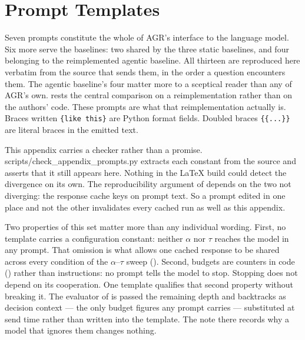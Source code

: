 \chapter{Prompt Templates}\label{app:prompts}


Seven prompts constitute the whole of AGR's interface to the language model. Six
more serve the baselines: two shared by the three static baselines, and four
belonging to the reimplemented agentic baseline. All thirteen are reproduced
here verbatim from the source that sends them, in the order a question
encounters them. The agentic baseline's four matter more to a sceptical reader
than any of AGR's own.  rests the central
comparison on a reimplementation rather than on the authors' code. These
prompts are what that reimplementation actually is. Braces written
\verb|{like this}| are Python format fields. Doubled braces \verb|{{...}}| are
literal braces in the emitted text.

This appendix carries a checker rather than a promise.
\textsf{scripts/\allowbreak check\_appendix\_prompts.py} extracts each constant
from the source and asserts that it still appears here. Nothing in the LaTeX
build could detect the divergence on its own. The reproducibility argument
of  depends on the two not diverging: the response
cache keys on prompt text. So a prompt edited in one place and not the other
invalidates every cached run as well as this appendix.

Two properties of this set matter more than any individual wording. First, no
template carries a configuration constant: neither $\alpha$ nor $\tau$ reaches
the model in any prompt. That omission is what allows one cached response to be
shared across every condition of the $\alpha$--$\tau$ sweep
(). Second, budgets are counters in code
() rather than instructions: no prompt tells the model to
stop. Stopping does not depend on its cooperation. One template qualifies that
second property without breaking it. The evaluator of
 is passed the remaining depth and backtracks as
decision context --- the only budget figures any prompt carries --- substituted
at send time rather than written into the template. The note there records why a
model that ignores them changes nothing.

